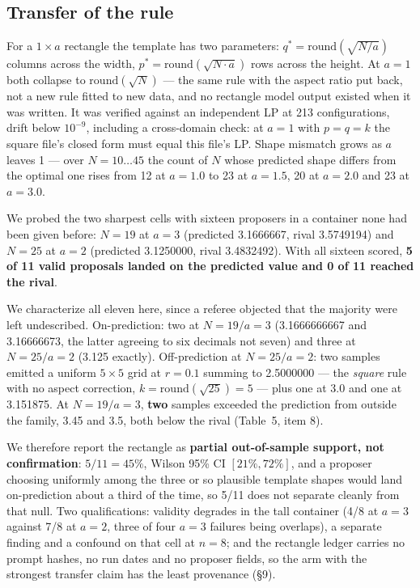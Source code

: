 \documentclass[11pt]{article}
\begin{document}
\subsection{Transfer of the rule}

For a $1 \times a$ rectangle the template has two parameters: $q^{*} = \mathrm{round}(\sqrt{N/a})$ columns across the
width, $p^{*} = \mathrm{round}(\sqrt{N \cdot a})$ rows across the height. At $a = 1$ both collapse to $\mathrm{round}(\sqrt{N})$ --- the
same rule with the aspect ratio put back, not a new rule fitted to new data, and no rectangle
model output existed when it was written. It was verified against an independent LP at 213
configurations, drift below $10^{-9}$, including a cross-domain check: at $a = 1$ with $p = q = k$ the
square file's closed form must equal this file's LP. Shape mismatch grows as $a$ leaves 1 --- over
$N = 10\ldots45$ the count of $N$ whose predicted shape differs from the optimal one rises from 12 at
$a = 1.0$ to 23 at $a = 1.5$, 20 at $a = 2.0$ and 23 at $a = 3.0$.

We probed the two sharpest cells with sixteen proposers in a container none had been given
before: $N = 19$ at $a = 3$ (predicted 3.1666667, rival 3.5749194) and $N = 25$ at $a = 2$ (predicted
3.1250000, rival 3.4832492). With all sixteen scored, \textbf{5 of 11 valid proposals landed on the
predicted value and 0 of 11 reached the rival}.

We characterize all eleven here, since a referee objected that the majority were left
undescribed. On-prediction: two
at $N = 19/a = 3$ (3.1666666667 and 3.16666673, the latter agreeing to six decimals not seven) and
three at $N = 25/a = 2$ (3.125 exactly). Off-prediction at $N = 25/a = 2$: two samples emitted a
uniform $5\times5$ grid at $r = 0.1$ summing to 2.5000000 --- the \textit{square} rule with no aspect correction,
$k = \mathrm{round}(\sqrt{25}) = 5$ --- plus one at 3.0 and one at 3.151875. At $N = 19/a = 3$, \textbf{two} samples
exceeded the prediction from outside the family, 3.45 and 3.5, both below the rival (Table~5,
item 8).

We therefore report the rectangle as \textbf{partial out-of-sample support, not confirmation}:
$5/11 = 45\%$, Wilson 95\% CI $[21\%, 72\%]$, and a proposer choosing uniformly among the three or so
plausible template shapes would land on-prediction about a third of the time, so 5/11 does not
separate cleanly from that null. Two qualifications: validity degrades in the tall container
(4/8 at $a = 3$ against 7/8 at $a = 2$, three of four $a = 3$ failures being overlaps), a separate
finding and a confound on that cell at $n = 8$; and the rectangle ledger carries no prompt hashes,
no run dates and no proposer fields, so the arm with the strongest transfer claim has the least
provenance (\S9).
\end{document}

